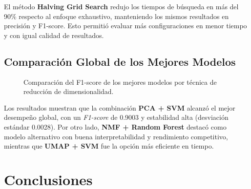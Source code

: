 \documentclass[conference]{IEEEtran}
\begin{document}
El método \textbf{Halving Grid Search} redujo los tiempos de búsqueda en más del 90\% respecto al enfoque exhaustivo, manteniendo los mismos resultados en precisión y F1-score.  
Esto permitió evaluar más configuraciones en menor tiempo y con igual calidad de resultados.

\subsection{Comparación Global de los Mejores Modelos}

\begin{table}[!htbp]
\centering
\caption{Comparativa global de los mejores modelos por técnica.}
{\small\setlength{\tabcolsep}{4pt}%
}
\label{tab:mejores}
\end{table}


\begin{figure}[!htbp]
\centering

\vspace{-2mm}
\caption{Comparación del F1-score de los mejores modelos por técnica de reducción de dimensionalidad.}
\label{fig:mejores_modelos}
\end{figure}




Los resultados muestran que la combinación \textbf{PCA + SVM} alcanzó el mejor desempeño global, con un \textit{F1-score} de 0.9003 y estabilidad alta (desviación estándar 0.0028).  
Por otro lado, \textbf{NMF + Random Forest} destacó como modelo alternativo con buena interpretabilidad y rendimiento competitivo, mientras que \textbf{UMAP + SVM} fue la opción más eficiente en tiempo.

\section{Conclusiones}
\end{document}
